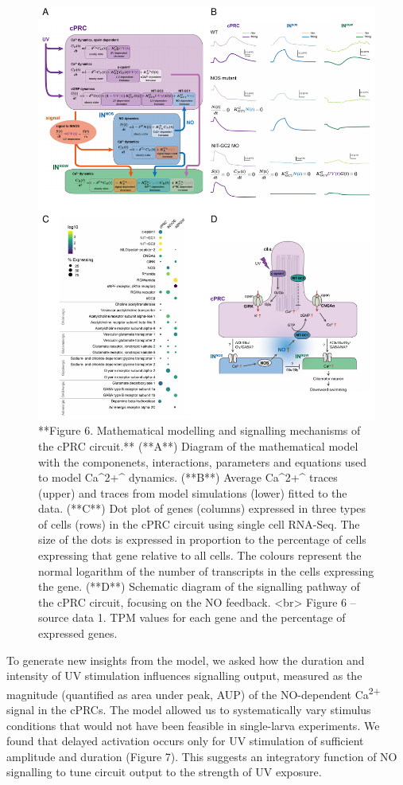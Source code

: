 \documentclass[
  10pt,
  onecolumn]{article}
\begin{document}
\begin{figure}
\includegraphics[width=25in]{figures/Fig6} \caption{**Figure 6. Mathematical modelling and signalling mechanisms of the cPRC circuit.** (**A**) Diagram of the mathematical model with the componenets, interactions, parameters and equations used to model Ca^2+^ dynamics. (**B**) Average Ca^2+^ traces (upper) and traces from model simulations (lower) fitted to the data. (**C**) Dot plot of genes (columns) expressed in three types of cells (rows) in the cPRC circuit using single cell RNA-Seq. The size of the dots is expressed in proportion to the percentage of cells expressing that gene relative to all cells. The colours represent the normal logarithm of the number of transcripts in the cells expressing the gene. (**D**) Schematic diagram of the signalling pathway of the cPRC circuit, focusing on the NO feedback. <br> Figure 6 -- source data 1. TPM values for each gene and the percentage of expressed genes.}\label{fig:unnamed-chunk-6}
\end{figure}

To generate new insights from the model, we asked how the duration and
intensity of UV stimulation influences signalling output, measured as
the magnitude (quantified as area under peak, AUP) of the NO-dependent
Ca\textsuperscript{2+} signal in the cPRCs. The model allowed us to
systematically vary stimulus conditions that would not have been
feasible in single-larva experiments. We found that delayed activation
occurs only for UV stimulation of sufficient amplitude and duration
(Figure 7). This suggests an integratory function of NO signalling to
tune circuit output to the strength of UV exposure.
\end{document}
